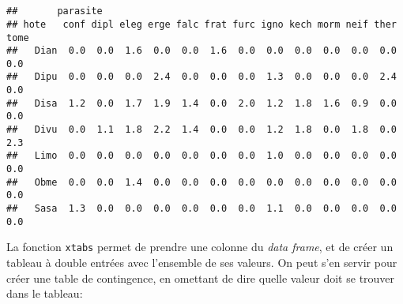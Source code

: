 \begin{knitrout}
\color{fgcolor}\begin{kframe}
\begin{flushleft}
\ttfamily\noindent
{}\hlassignement{\usebox{\hlnormalsizeboxlessthan}-}{\ }\hlkeyword{(}\hlkeyword{,}{\ }\hlargument{=}{\ }\hlkeyword{(}\hlargument{=}{\ }\hlkeyword{\usebox{\hlnormalsizeboxdollar}}\hlkeyword{,}{\ }\hlargument{=}{\ }\hlkeyword{\usebox{\hlnormalsizeboxdollar}}\hlkeyword{)}\hlkeyword{,}\hspace*{\fill}\\
\hlstd{}{\ }{\ }{\ }{\ }\hlkeyword{,}{\ }\hlargument{=}{\ }\hlkeyword{)}\hspace*{\fill}\\
\hlstd{}\hlkeyword{(}\hlkeyword{(}\hlkeyword{\urltilda{}}{\ }\hlkeyword{+}{\ }\hlkeyword{,}{\ }\hlkeyword{)}\hlkeyword{,}{\ }\hlkeyword{)}\mbox{}
\normalfont
\end{flushleft}
\begin{verbatim}
##       parasite
## hote   conf dipl eleg erge falc frat furc igno kech morm neif ther tome
##   Dian  0.0  0.0  1.6  0.0  0.0  1.6  0.0  0.0  0.0  0.0  0.0  0.0  0.0
##   Dipu  0.0  0.0  0.0  2.4  0.0  0.0  0.0  1.3  0.0  0.0  0.0  2.4  0.0
##   Disa  1.2  0.0  1.7  1.9  1.4  0.0  2.0  1.2  1.8  1.6  0.9  0.0  0.0
##   Divu  0.0  1.1  1.8  2.2  1.4  0.0  0.0  1.2  1.8  0.0  1.8  0.0  2.3
##   Limo  0.0  0.0  0.0  0.0  0.0  0.0  0.0  1.0  0.0  0.0  0.0  0.0  0.0
##   Obme  0.0  0.0  1.4  0.0  0.0  0.0  0.0  0.0  0.0  0.0  0.0  0.0  0.0
##   Sasa  1.3  0.0  0.0  0.0  0.0  0.0  0.0  1.1  0.0  0.0  0.0  0.0  0.0
\end{verbatim}
\end{kframe}
\end{knitrout}


La fonction \texttt{xtabs} permet de prendre une colonne du \emph{data frame}, et de créer un tableau à double entrées avec l'ensemble de ses valeurs. On peut s'en servir pour créer une table de contingence, en omettant de dire quelle valeur doit se trouver dans le tableau:

